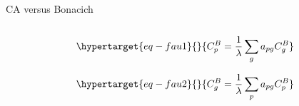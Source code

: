\documentclass[
  ignorenonframetext,
]{beamer}
\begin{document}
\begin{frame}{CA versus Bonacich}
\begin{columns}[T]
\begin{column}{0.5\textwidth}
\begin{equation}\protect\hypertarget{eq-fau1}{}{
    C^B_p = \frac{1}{\lambda}\sum_{g}a_{pg}C^B_g
}\label{eq-fau1}\end{equation}

\begin{equation}\protect\hypertarget{eq-fau2}{}{
    C^B_g = \frac{1}{\lambda}\sum_{p}a_{pg}C^B_p
}\label{eq-fau2}\end{equation}
\end{column}
\end{columns}

\end{frame}
\end{document}
